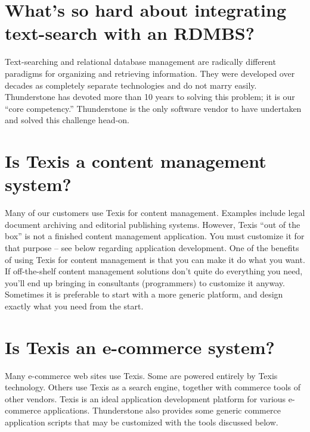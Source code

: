 \section{What's so hard about integrating text-search with an RDMBS? }

Text-searching and relational database management are radically
different paradigms for organizing and retrieving information. They
were developed over decades as completely separate technologies and do
not marry easily. Thunderstone has devoted more than 10 years to
solving this problem; it is our ``core competency.'' Thunderstone is
the only software vendor to have undertaken and solved this challenge
head-on.

\section{Is Texis a content management system? }

Many of our customers use Texis for content management. Examples
include legal document archiving and editorial publishing
systems. However, Texis ``out of the box'' is not a finished content
management application. You must customize it for that purpose -- see
below regarding application development.  One of the benefits of using
Texis for content management is that you can make it do what you want.
If off-the-shelf content management solutions don't quite do
everything you need, you'll end up bringing in consultants
(programmers) to customize it anyway. Sometimes it is preferable to
start with a more generic platform, and design exactly what you need
from the start.

\section{Is Texis an e-commerce system? }

Many e-commerce web sites use Texis. Some are powered entirely by
Texis technology. Others use Texis as a search engine, together with
commerce tools of other vendors. Texis is an ideal application
development platform for various e-commerce applications. Thunderstone
also provides some generic commerce application scripts that may be
customized with the tools discussed below.

